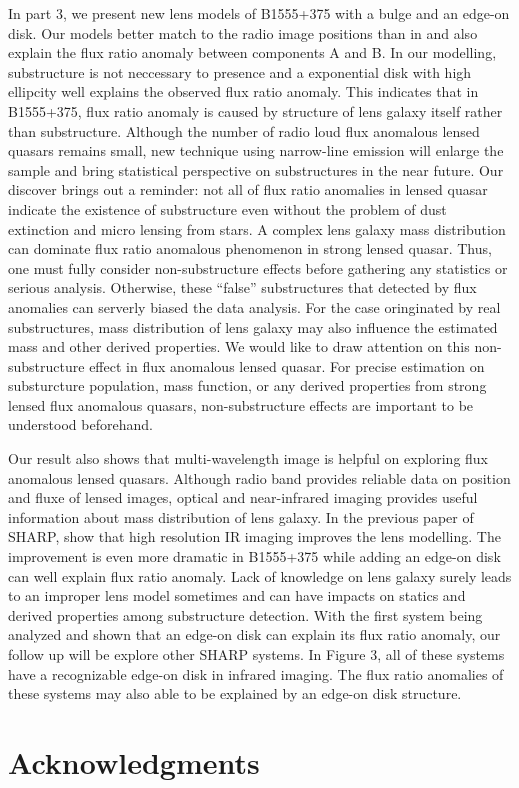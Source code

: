\documentclass[usenatbib]{mn2e}
\begin{document}
In part 3, we present new lens models of B1555+375 with a bulge and an edge-on disk. Our models better match to the radio image positions than in \citet{Marlow} and also explain the flux ratio anomaly between components A and B. In our modelling, substructure is not neccessary to presence and a  exponential disk with high ellipcity well explains the observed flux ratio anomaly. This indicates that in B1555+375, flux ratio anomaly is caused by structure of lens galaxy itself rather than substructure. Although the number of radio loud flux anomalous lensed quasars remains small, new technique using narrow-line emission will enlarge the sample and bring statistical perspective on substructures in the near future. Our discover brings out a reminder: not all of flux ratio anomalies in lensed quasar indicate the existence of substructure even without the problem of dust extinction and micro lensing from stars. A complex lens galaxy mass distribution can dominate flux ratio anomalous phenomenon in strong lensed quasar. Thus, one must fully consider non-substructure effects before gathering any statistics or serious analysis. Otherwise, these ``false'' substructures that detected by flux anomalies can serverly biased the data analysis. For the case oringinated by real  substructures, mass distribution of lens galaxy may also influence the estimated mass and other derived properties. We would like to draw attention on this non-substructure effect in flux anomalous lensed quasar. For precise estimation on substurcture population, mass function, or any derived properties from strong lensed flux anomalous quasars, non-substructure effects are important to be understood beforehand.

Our result also shows that multi-wavelength image is helpful on exploring flux anomalous lensed quasars. Although radio band provides reliable data on position and fluxe of lensed images, optical and near-infrared imaging provides useful information about mass distribution of lens galaxy. In the previous paper of SHARP, \citet{SHARP12} show that high resolution IR imaging improves the lens modelling. The improvement is even more dramatic in B1555+375 while adding an edge-on disk can well explain flux ratio anomaly. Lack of knowledge on lens galaxy surely leads to an improper lens model sometimes and can have impacts on statics and derived properties among substructure detection. With the first system being analyzed and shown that an edge-on disk can explain its flux ratio anomaly, our follow up will be explore other SHARP systems. In Figure 3, all of these systems have a recognizable edge-on disk in infrared imaging. The flux ratio anomalies of these systems may also able to be explained by an edge-on disk structure.\\
 

\section*{Acknowledgments}







\label{lastpage}
\end{document}
